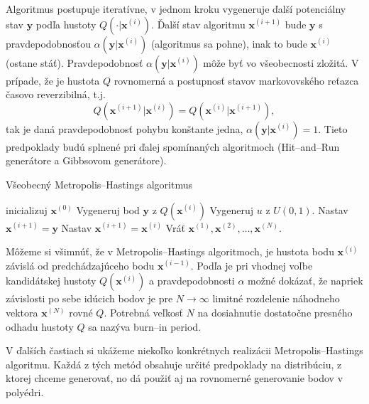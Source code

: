 Algoritmus postupuje iteratívne, v jednom kroku vygeneruje ďalší potenciálny stav $\mathbf y$ podľa hustoty $Q(\cdot|\mathbf x^{(i)})$. Ďalší stav algoritmu $\mathbf x^{(i+1)}$ bude $\mathbf y$ s pravdepodobnosťou $\alpha (\mathbf y|\mathbf x^{(i)})$ (algoritmus sa pohne), inak to bude $\mathbf x^{(i)}$ (ostane stáť).
Pravdepodobnosť $\alpha (\mathbf y|\mathbf x^{(i)})$ môže byť vo všeobecnosti zložitá. V prípade, že je hustota $Q$ rovnomerná a postupnosť stavov markovovského reťazca časovo reverzibilná, t.j. $$Q(\mathbf x^{(i+1)}|\mathbf x^{(i)})=Q(\mathbf x^{(i)}|\mathbf x^{(i+1)}),$$ tak je daná pravdepodobnosť pohybu konštante jedna, $\alpha (\mathbf y|\mathbf x^{(i)})=1$. Tieto predpoklady budú splnené pri ďalej spomínaných algoritmoch (Hit--and--Run generátore a Gibbsovom generátore).

\begin{algorithm}[H]
	\caption{Všeobecný Metropolis--Hastings algoritmus \cite{metropolis-hastings_chib}}
	\label{metropolis-hastings}
	\begin{algorithmic}[1]
		\State inicializuj $\mathbf x^{(0)}$
			\State Vygeneruj bod $\mathbf y$ z $Q(\mathbf x^{(i)})$
			\State Vygeneruj $u$ z $U(0,1)$.
				\State Nastav $\mathbf x^{(i+1)}=\mathbf y$
			\Else
				\State Nastav $\mathbf x^{(i+1)}=\mathbf x^{(i)}$
			\EndIf
		\EndFor
		\State Vráť ${\mathbf x^{(1)},\mathbf x^{(2)},\dots,\mathbf x^{(N)}}$.
	\end{algorithmic}
\end{algorithm}

Môžeme si všimnúť, že v Metropolis--Hastings algoritmoch, je hustota bodu $\mathbf x^{(i)}$ závislá od predchádzajúceho bodu $\mathbf x^{(i-1)}$. Podľa \cite{metropolis-hastings_chib} je pri vhodnej voľbe kandidátskej hustoty $Q(\mathbf x^{(i)})$ a pravdepodobnosti $\alpha$ možné dokázať, že napriek závislosti po sebe idúcich bodov je pre $N \rightarrow \infty$ limitné rozdelenie náhodneho vektora $\mathbf x^{(N)}$ rovné $Q$. Potrebná veľkosť $N$ na dosiahnutie dostatočne presného odhadu hustoty $Q$ sa nazýva burn--in period.

V ďalších častiach si ukážeme niekoľko konkrétnych realizácii Metropolis--Hastings algoritmu. Každá z tých metód obsahuje určité predpoklady na distribúciu, z ktorej chceme generovať, no dá použiť aj na rovnomerné generovanie bodov v polyédri.